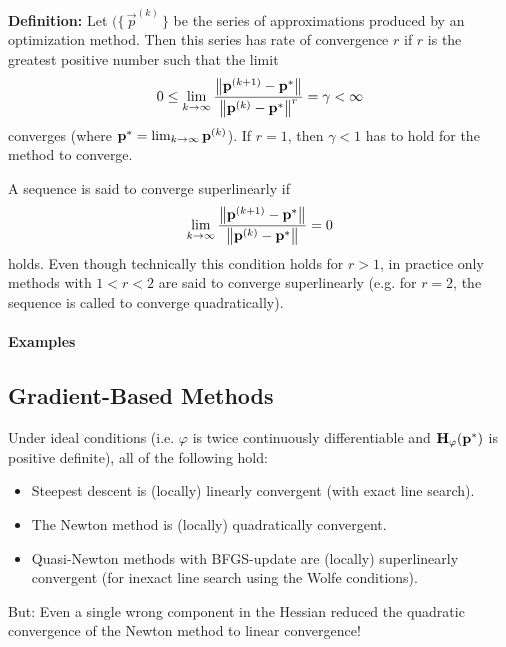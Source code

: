 		\textbf{Definition:}
		Let \( \big(\{\, \vec{p}^{(k)} \,\big\} \) be the series of approximations produced by an optimization method. Then this series has rate of convergence \(r\) if \(r\) is the greatest positive number such that the limit
		\begin{align*}
			0 \leq \liminfty[k] \frac{\big\lVert \vec{p}^{(k + 1)} - \vec{p}^\ast \big\rVert}{\big\lVert \vec{p}^{(k)} - \vec{p}^\ast \big\rVert^r} = \gamma < \infty
		\end{align*}
		converges (where \( \vec{p}^\ast = \liminfty[k] \vec{p}^{(k)} \)). If \( r = 1 \), then \( \gamma < 1 \) has to hold for the method to converge.
		
		A sequence is said to converge superlinearly if
		\begin{align*}
			\liminfty[k] \frac{\big\lVert \vec{p}^{(k + 1)} - \vec{p}^\ast \big\rVert}{\big\lVert \vec{p}^{(k)} - \vec{p}^\ast \big\rVert} = 0
		\end{align*}
		holds. Even though technically this condition holds for \( r > 1 \), in practice only methods with \( 1 < r < 2 \) are said to converge superlinearly (e.g. for \(r = 2\), the sequence is called to converge quadratically).

		\paragraph{Examples} %
		
		\subsection{Gradient-Based Methods}
			Under ideal conditions (i.e. \(\varphi\) is twice continuously differentiable and \( \mat{H}_\varphi(\vec{p}^\ast) \) is positive definite), all of the following hold:
			\begin{itemize}
				\item Steepest descent is (locally) linearly convergent (with exact line search).
				\item The Newton method is (locally) quadratically convergent.
				\item Quasi-Newton methods with BFGS-update are (locally) superlinearly convergent (for inexact line search using the Wolfe conditions).
			\end{itemize}
			But: Even a single wrong component in the Hessian reduced the quadratic convergence of the Newton method to linear convergence!

